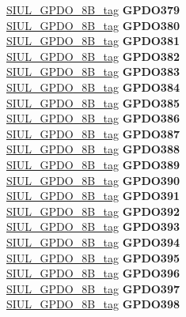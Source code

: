 \begin{DoxyCompactItemize}
\begin{tabbing}
\>\>\mbox{\hyperlink{unionSIUL__GPDO__8B__tag}{SIUL\_GPDO\_8B\_tag}} {\bfseries GPDO379}\\
\>\>\mbox{\hyperlink{unionSIUL__GPDO__8B__tag}{SIUL\_GPDO\_8B\_tag}} {\bfseries GPDO380}\\
\>\>\mbox{\hyperlink{unionSIUL__GPDO__8B__tag}{SIUL\_GPDO\_8B\_tag}} {\bfseries GPDO381}\\
\>\>\mbox{\hyperlink{unionSIUL__GPDO__8B__tag}{SIUL\_GPDO\_8B\_tag}} {\bfseries GPDO382}\\
\>\>\mbox{\hyperlink{unionSIUL__GPDO__8B__tag}{SIUL\_GPDO\_8B\_tag}} {\bfseries GPDO383}\\
\>\>\mbox{\hyperlink{unionSIUL__GPDO__8B__tag}{SIUL\_GPDO\_8B\_tag}} {\bfseries GPDO384}\\
\>\>\mbox{\hyperlink{unionSIUL__GPDO__8B__tag}{SIUL\_GPDO\_8B\_tag}} {\bfseries GPDO385}\\
\>\>\mbox{\hyperlink{unionSIUL__GPDO__8B__tag}{SIUL\_GPDO\_8B\_tag}} {\bfseries GPDO386}\\
\>\>\mbox{\hyperlink{unionSIUL__GPDO__8B__tag}{SIUL\_GPDO\_8B\_tag}} {\bfseries GPDO387}\\
\>\>\mbox{\hyperlink{unionSIUL__GPDO__8B__tag}{SIUL\_GPDO\_8B\_tag}} {\bfseries GPDO388}\\
\>\>\mbox{\hyperlink{unionSIUL__GPDO__8B__tag}{SIUL\_GPDO\_8B\_tag}} {\bfseries GPDO389}\\
\>\>\mbox{\hyperlink{unionSIUL__GPDO__8B__tag}{SIUL\_GPDO\_8B\_tag}} {\bfseries GPDO390}\\
\>\>\mbox{\hyperlink{unionSIUL__GPDO__8B__tag}{SIUL\_GPDO\_8B\_tag}} {\bfseries GPDO391}\\
\>\>\mbox{\hyperlink{unionSIUL__GPDO__8B__tag}{SIUL\_GPDO\_8B\_tag}} {\bfseries GPDO392}\\
\>\>\mbox{\hyperlink{unionSIUL__GPDO__8B__tag}{SIUL\_GPDO\_8B\_tag}} {\bfseries GPDO393}\\
\>\>\mbox{\hyperlink{unionSIUL__GPDO__8B__tag}{SIUL\_GPDO\_8B\_tag}} {\bfseries GPDO394}\\
\>\>\mbox{\hyperlink{unionSIUL__GPDO__8B__tag}{SIUL\_GPDO\_8B\_tag}} {\bfseries GPDO395}\\
\>\>\mbox{\hyperlink{unionSIUL__GPDO__8B__tag}{SIUL\_GPDO\_8B\_tag}} {\bfseries GPDO396}\\
\>\>\mbox{\hyperlink{unionSIUL__GPDO__8B__tag}{SIUL\_GPDO\_8B\_tag}} {\bfseries GPDO397}\\
\>\>\mbox{\hyperlink{unionSIUL__GPDO__8B__tag}{SIUL\_GPDO\_8B\_tag}} {\bfseries GPDO398}\\

\end{tabbing}
\end{DoxyCompactItemize}
